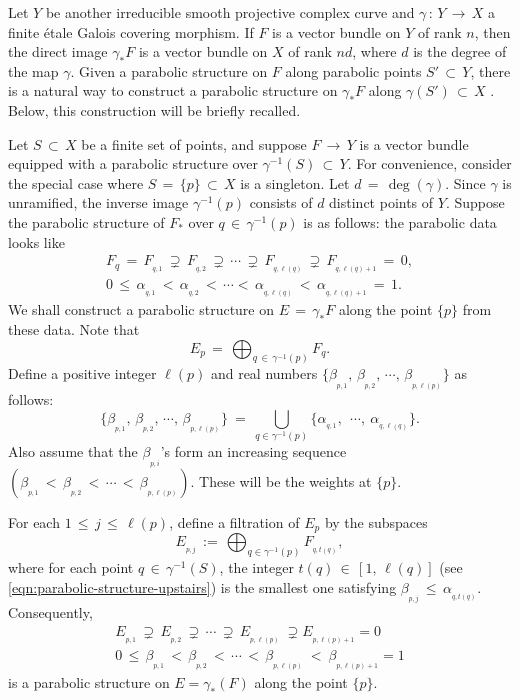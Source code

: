 \documentclass[10pt,reqno]{amsart}
\theoremstyle{myroman}
\numberwithin{equation}{section}
\begin{document}
	Let $Y$ be another irreducible smooth projective complex curve and $\gamma\,:\,  Y\,\longrightarrow\,
	X$ a finite \'etale Galois covering morphism. If $F$ is a vector bundle on $Y$ of rank $n$, then
	the direct image $\gamma_*F$ is a vector bundle on $X$ of rank $nd$, where $d$ is the 
	degree of the map $\gamma$. Given a parabolic structure on $F$ along parabolic points $S'\,\subset
	\,Y$, there is a natural way to construct a parabolic structure on $\gamma_* F$ along
	$\gamma(S')\,\subset\, X$ \cite[\S~3]{BM19}. Below, this construction will be briefly recalled.
	
	Let $S\,\subset\, X$ be a finite set of points, and suppose $F\, \longrightarrow\, Y$ is a vector bundle
	equipped with a parabolic structure
	over $\gamma^{-1}(S)\,\subset\, Y$. For convenience, consider the special case where $S\,=
	\,\{p\}\,\subset\, X$ is a singleton. Let $d\,=\,\deg(\gamma)$. Since $\gamma$ is unramified, the inverse
	image $\gamma^{-1}(p)$ consists of $d$ distinct points of $Y$. Suppose the parabolic structure of
	$F_*$ over $q\,\in\, \gamma^{-1}(p)$ is as follows:
	the parabolic data looks like
	\begin{align}\label{eqn:parabolic-structure-upstairs}
		F_q \,=\, F_{_{q,1}}\,\supsetneq\, F_{_{q,2}}\,\supsetneq \,\cdots\,\supsetneq\, F_{_{q,\ell(q)}}
		\,\supsetneq\, F_{_{q,\ell(q)+1}}\,=\,0,\\
		0\, \leq\,  \alpha_{_{q,1}}\,<\,\alpha_{_{q,2}}\,<\,\cdots<\,\alpha_{_{q,\ell(q)}}\,<\,\alpha_{_{q,\ell(q)+1}}\,=\,1.
	\end{align}
	We shall construct a parabolic structure on $E\,=\,\gamma_*F$ along the point $\{p\}$ from these data. Note that
	\[E_p\,=\,\bigoplus_{q\,\in\, \gamma^{-1}(p)}F_{q}.\]
	Define a positive integer $\ell(p)$ and real numbers $\{\beta_{_{p,1}},\,\beta_{_{p,2}},\,\cdots,\,
	\beta_{_{p,\ell(p)}}\}$ as follows: $$\{\beta_{_{p,1}},\,\beta_{_{p,2}},\,\cdots,\,\beta_{_{p,\ell(p)}}\} \ =\ \bigcup_{q\in\gamma^{-1}(p)}\{\alpha_{_{q,1}},\ \ \cdots,\ \alpha_{_{q,\ell(q)}}\}.$$
	Also assume that the $\beta_{_{p,i}}$'s form an increasing sequence
	$\left(\beta_{_{p,1}}\,<\,\beta_{_{p,2}}\,<\,\cdots\,<\,\beta_{_{p,\ell(p)}}\right)$. These will be
	the weights at $\{p\}$.
	
	For each $1\,\leq\, j\,\leq\, \ell(p)$, define a filtration of $E_p$ by the subspaces
	$$E_{_{p,j}} \,:=\, \bigoplus_{q\in\gamma^{-1}(p)}F_{_{q,t(q)}},$$
	where for each point $q\,\in\, \gamma^{-1}(S)$, the integer $t(q)\,\in\,[1,\,\ell(q)]$ (see
	\eqref{eqn:parabolic-structure-upstairs}) is the smallest one satisfying $\beta_{_{p,j}}\,\leq\, \alpha_{_{q,t(q)}}.$ Consequently,
	\begin{align*}
		E_{_{p,1}}\,\supsetneq\, E_{_{p,2}}\,\supsetneq\,\cdots\,\supsetneq\, E_{_{p,\ell(p)}}\ \supsetneq E_{_{p,\ell(p)+1}}=0\\
		0\, \leq\, \beta_{_{p,1}}\,<\,\beta_{_{p,2}}\,<\,\cdots\,<\,\beta_{_{p,\ell(p)}}\ < \ \beta_{_{p,\ell(p)+1}}=1
	\end{align*}
	is a parabolic structure on $E=\gamma_*(F)$ along the point $\{p\}$.
	
\end{document}
